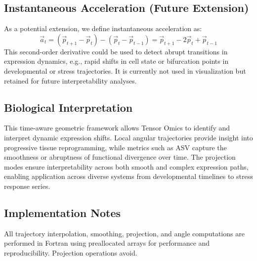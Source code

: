     \subsection{Instantaneous Acceleration (Future Extension)}

        As a potential extension, we define instantaneous acceleration as:
        \[
        \vec{a}_t = (\vec{p}_{t+1} - \vec{p}_t) - (\vec{p}_t - \vec{p}_{t-1}) = \vec{p}_{t+1} - 2\vec{p}_t + \vec{p}_{t-1}
        \]
        This second-order derivative could be used to detect abrupt transitions in expression dynamics, e.g., rapid shifts in cell state or bifurcation points in developmental or stress trajectories. It is currently not used in visualization but retained for future interpretability analyses.

    \subsection{Biological Interpretation}

        This time-aware geometric framework allows Tensor Omics to identify and interpret dynamic expression shifts. Local angular trajectories provide insight into progressive tissue reprogramming, while metrics such as ASV capture the smoothness or abruptness of functional divergence over time. The projection modes ensure interpretability across both smooth and complex expression paths, enabling application across diverse systems from developmental timelines to stress response series.

    \subsection{Implementation Notes}

        All trajectory interpolation, smoothing, projection, and angle computations are performed in Fortran using preallocated arrays for performance and reproducibility. Projection operations avoid.